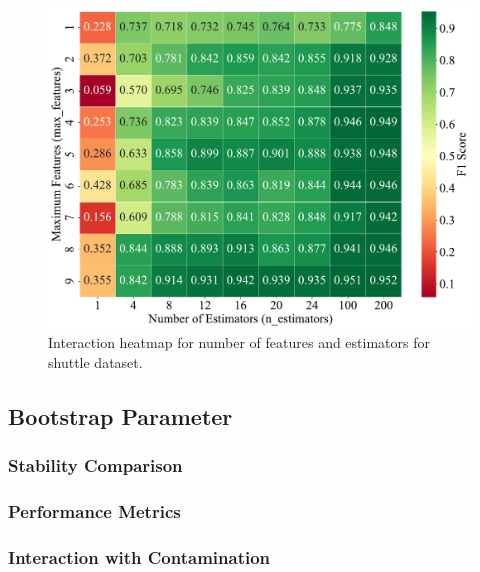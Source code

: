 \documentclass[10pt, conference]{IEEEtran}
\begin{document}
\begin{figure}[H]
	\centering
	\includegraphics[width=0.95\linewidth]{../results/shuttle/max_features/interaction_f1_heatmap.pdf}
	\caption{Interaction heatmap for number of features and estimators for shuttle dataset.}
	\label{fig:int_hm_shuttle}
\end{figure}


\subsection{Bootstrap Parameter}
\subsubsection{Stability Comparison}





\subsubsection{Performance Metrics}


\subsubsection{Interaction with Contamination}
\end{document}
